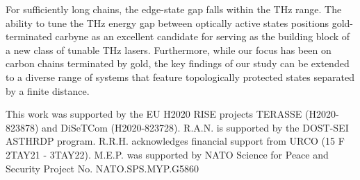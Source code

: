\documentclass[
preprint,
 amsmath,amssymb,
 aps,
]{revtex4-2}
\begin{document}
For sufficiently long chains, the edge-state gap falls within the THz range. The ability to tune the THz energy gap between optically active states positions gold-terminated carbyne as an excellent candidate for serving as the building block of a new class of tunable THz lasers. Furthermore, while our focus has been on carbon chains terminated by gold, the key findings of our study can be extended to a diverse range of systems that feature topologically protected states separated by a finite distance.

\begin{acknowledgments}
This work was supported by the EU H2020 RISE projects TERASSE (H2020-823878) and DiSeTCom (H2020-823728). R.A.N. is supported by the DOST-SEI ASTHRDP program. R.R.H. acknowledges financial support from URCO (15 F 2TAY21 - 3TAY22). M.E.P. was supported by NATO Science for Peace and Security Project No. NATO.SPS.MYP.G5860
\end{acknowledgments}


\end{document}
